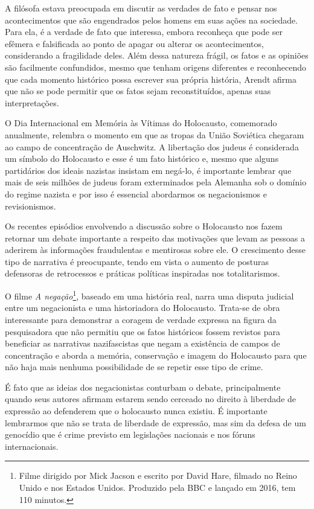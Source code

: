 A filósofa estava preocupada em discutir as verdades de fato e pensar
nos acontecimentos que são engendrados pelos homens em suas ações na
sociedade. Para ela, é a verdade de fato que interessa, embora reconheça
que pode ser efêmera e falsificada ao ponto de apagar ou alterar os
acontecimentos, considerando a fragilidade deles. Além dessa natureza
frágil, os fatos e as opiniões são facilmente confundidos, mesmo que
tenham origens diferentes e reconhecendo que cada momento histórico
possa escrever sua própria história, Arendt afirma que não se pode
permitir que os fatos sejam reconstituídos, apenas suas interpretações.

O Dia Internacional em Memória às Vítimas do Holocausto, comemorado
anualmente, relembra o momento em que as tropas da União Soviética
chegaram ao campo de concentração de Auschwitz. A libertação dos judeus
é considerada um símbolo do Holocausto e esse é um fato histórico e,
mesmo que alguns partidários dos ideais nazistas insistam em negá-lo, é
importante lembrar que mais de seis milhões de judeus foram exterminados
pela Alemanha sob o domínio do regime nazista e por isso é essencial
abordarmos os negacionismos e revisionismos.

Os recentes episódios envolvendo a discussão sobre o Holocausto nos
fazem retornar um debate importante a respeito das motivações que levam
as pessoas a aderirem às informações fraudulentas e mentirosas sobre
ele. O crescimento desse tipo de narrativa é preocupante, tendo em vista
o aumento de posturas defensoras de retrocessos e práticas políticas
inspiradas nos totalitarismos.

O filme \textit{A negação}\footnote{Filme dirigido por Mick Jacson e
  escrito por David Hare, filmado no Reino Unido e nos Estados Unidos. Produzido pela BBC e lançado em 2016, tem 110 minutos.}, baseado em uma história real, narra uma
disputa judicial entre um negacionista e uma historiadora do Holocausto.
Trata-se de obra interessante para demonstrar a coragem de verdade
expressa na figura da pesquisadora que não permitiu que os fatos
históricos fossem revistos para beneficiar as narrativas nazifascistas
que negam a existência de campos de concentração e aborda a memória,
conservação e imagem do Holocausto para que não haja mais nenhuma
possibilidade de se repetir esse tipo de crime.

É fato que as ideias dos negacionistas conturbam o debate,
principalmente quando seus autores afirmam estarem sendo cerceado no
direito à liberdade de expressão ao defenderem que o holocausto nunca
existiu. É importante lembrarmos que não se trata de liberdade de
expressão, mas sim da defesa de um genocídio que é crime previsto em
legislações nacionais e nos fóruns internacionais.

